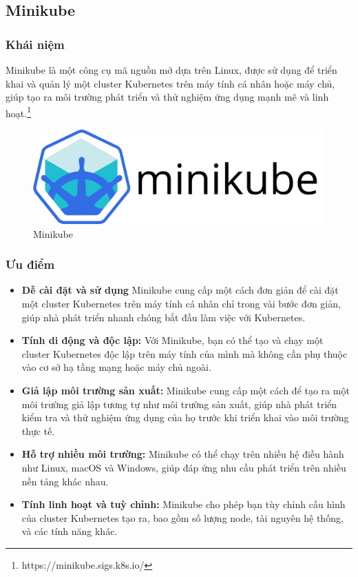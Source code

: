\subsection{Minikube}
\subsubsection{Khái niệm}
\noindent Minikube là một công cụ mã nguồn mở dựa trên Linux, được sử dụng để triển khai và quản lý một cluster Kubernetes trên máy tính cá nhân hoặc máy chủ, giúp tạo ra môi trường phát triển và thử nghiệm ứng dụng mạnh mẽ và linh hoạt.\footnote{https://minikube.sigs.k8s.io/}
\begin{figure}[H]
  \begin{center}
    \includegraphics[scale=0.35]{images/hieu/phuluc/minikube.png}
    \caption{Minikube}
  \end{center}
\end{figure}
\subsubsection{Ưu điểm}
\begin{itemize}
  \item \textbf{Dễ cài đặt và sử dụng} Minikube cung cấp một cách đơn giản để cài đặt một cluster Kubernetes trên máy tính cá nhân chỉ trong vài bước đơn giản, giúp nhà phát triển nhanh chóng bắt đầu làm việc với Kubernetes.
  \item \textbf{Tính di động và độc lập:} Với Minikube, bạn có thể tạo và chạy một cluster Kubernetes độc lập trên máy tính của mình mà không cần phụ thuộc vào cơ sở hạ tầng mạng hoặc máy chủ ngoài.
  \item \textbf{Giả lập môi trường sản xuất:} Minikube cung cấp một cách để tạo ra một môi trường giả lập tương tự như môi trường sản xuất, giúp nhà phát triển kiểm tra và thử nghiệm ứng dụng của họ trước khi triển khai vào môi trường thực tế.
  \item \textbf{Hỗ trợ nhiều môi trường:} Minikube có thể chạy trên nhiều hệ điều hành như Linux, macOS và Windows, giúp đáp ứng nhu cầu phát triển trên nhiều nền tảng khác nhau.
  \item \textbf{Tính linh hoạt và tuỳ chỉnh:} Minikube cho phép bạn tùy chỉnh cấu hình của cluster Kubernetes tạo ra, bao gồm số lượng node, tài nguyên hệ thống, và các tính năng khác.
\end{itemize} 
